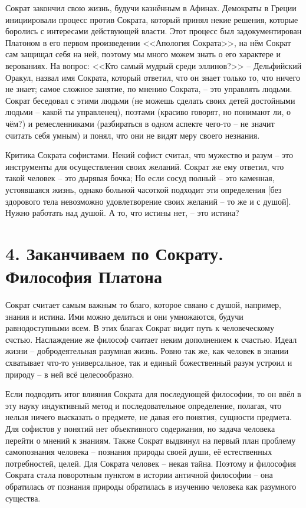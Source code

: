 \documentclass[a4paper, 12pt]{book} %
\begin{document}
 Сократ закончил свою жизнь, будучи казнённым в Афинах. Демократы в Греции инициировали процесс против Сократа, который принял некие решения, которые боролись с интересами действующей власти. Этот процесс был задокументирован Платоном в его первом произведении <<Апология Сократа>>, на нём Сократ сам защищал себя на ней, поэтому мы много можем знать о его характере и верованиях. На вопрос: <<Кто самый мудрый среди эллинов?>> -- Дельфийский Оракул, назвал имя Сократа, который ответил, что он знает только то, что ничего не знает; самое сложное занятие, по мнению Сократа, -- это управлять людьми. Сократ беседовал с этими людьми (не можешь сделать своих детей достойными людьми -- какой ты управленец), поэтами (красиво говорят, но понимают ли, о чём?) и ремесленниками (разбираться в одном аспекте чего-то -- не значит считать себя умным) и понял, что они не видят меру своего незнания.
 
Критика Сократа софистами. Некий софист считал, что мужество и разум -- это инструменты для осуществления своих желаний. Сократ же ему ответил, что такой человек -- это дырявая бочка; Но если сосуд полный -- это каменная, устоявшаяся жизнь, однако больной часоткой подходит эти определения [без здорового тела невозможно удовлетворение своих желаний -- то же и с душой]. Нужно работать над душой. А то, что истины нет, -- это истина? 

\section*{4. Заканчиваем по Сократу. Философия Платона}

Сократ считает самым важным то благо, которое свяано с душой, например, знания и истина. Ими можно делиться и они умножаются, будучи равнодоступными всем. В этих благах Сократ видит путь к человеческому счстью. Наслаждение же философ считает неким дополнением к счастью. Идеал жизни -- добродеятельная разумная жизнь. Ровно так же, как человек в знании схватывает что-то универсальное, так и единый божественный разум устроил и природу -- в ней всё целесообразно.


Если подводить итог влияния Сократа для последующей философии, то он ввёл в эту науку индуктивный метод и последовательное определение, полагая, что нельзя ничего высказать о предмете, не давая его понятия, сущности предмета.
Для софистов у понятий нет объективного содержания, но задача человека перейти о мнений к знаниям. Также Сократ выдвинул на первый план проблему самопознания человека -- познания природы своей души, её естественных потребностей, целей. Для Сократа человек -- некая тайна. Поэтому и философия Сократа стала поворотным пунктом в истории античной философии -- она обратилась от познания природы обратилась в изучению человека как разумного существа.
\end{document}
